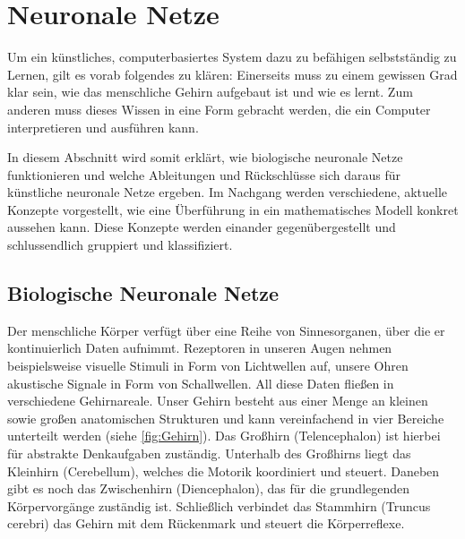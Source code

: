 

\section{Neuronale Netze}
Um ein künstliches, computerbasiertes System dazu zu befähigen selbstständig zu Lernen, gilt es vorab folgendes zu klären: Einerseits muss zu einem gewissen Grad klar sein, wie das menschliche Gehirn aufgebaut ist und wie es lernt. Zum anderen muss dieses Wissen in eine Form gebracht werden, die ein Computer interpretieren und ausführen kann.

In diesem Abschnitt wird somit erklärt, wie biologische neuronale Netze funktionieren und welche Ableitungen und Rückschlüsse sich daraus für künstliche neuronale Netze ergeben. Im Nachgang werden verschiedene, aktuelle Konzepte vorgestellt, wie eine Überführung in ein mathematisches Modell konkret aussehen kann. Diese Konzepte werden einander gegenübergestellt und schlussendlich gruppiert und klassifiziert.


\subsection{Biologische Neuronale Netze}

Der menschliche Körper verfügt über eine Reihe von Sinnesorganen, über die er kontinuierlich Daten aufnimmt. Rezeptoren in unseren Augen nehmen beispielsweise visuelle Stimuli in Form von Lichtwellen auf, unsere Ohren akustische Signale in Form von Schallwellen. All diese Daten fließen in verschiedene Gehirnareale. Unser Gehirn besteht aus einer Menge an kleinen sowie großen anatomischen Strukturen und kann vereinfachend in vier Bereiche unterteilt werden (siehe \autoref{fig:Gehirn}). Das Großhirn (Telencephalon) ist hierbei für abstrakte Denkaufgaben zuständig. Unterhalb des Großhirns liegt das Kleinhirn (Cerebellum), welches die Motorik koordiniert und steuert. Daneben gibt es noch das Zwischenhirn (Diencephalon), das für die grundlegenden Körpervorgänge zuständig ist. Schließlich verbindet das Stammhirn (Truncus cerebri) das Gehirn mit dem Rückenmark und steuert die Körperreflexe.

